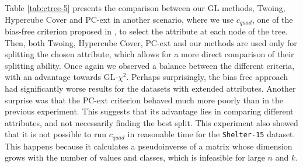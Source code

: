 


Table \ref{tab:ctree-5} presents the 
comparison between our GL methods, Twoing, Hypercube Cover and PC-ext in another scenario,
where we use $c_{quad}$, one of the bias-free criterion proposed in \cite{Hothorn:2006:URP}, to select the attribute at each node of the tree. 
Then, both Twoing, Hypercube Cover, PC-ext and our methods are  used only for splitting the chosen attribute, which allows for a  more direct comparison of their splitting ability. Once again we observed a balance between the different criteria, with an advantage towards GL-$\chi^2$. Perhaps surprisingly, the bias free approach had significantly worse results for the datasets with extended attributes. Another surprise was that the PC-ext criterion behaved much more poorly than in the previous experiment. This suggests that its advantage lies in comparing different attributes, and not necessarily finding the best split. This experiment also showed that it is not possible to run $c_{quad}$ in reasonable time for the {\tt Shelter-15} dataset. This happens because it calculates a pseudoinverse of a matrix whose dimension grows with the number of values and classes, which is infeasible for large $n$ and $k$.


